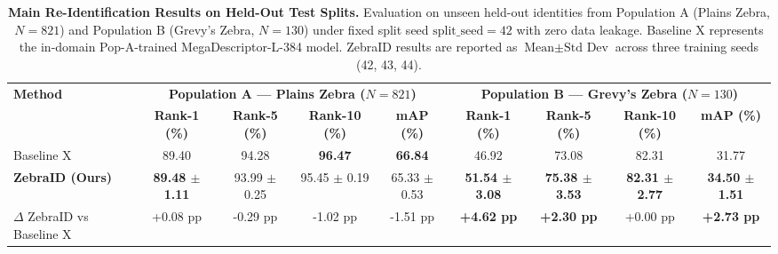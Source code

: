 \begin{table}[t]
\centering
\small
\caption{\textbf{Main Re-Identification Results on Held-Out Test Splits.} Evaluation on unseen held-out identities from Population A (Plains Zebra, $N=821$) and Population B (Grevy's Zebra, $N=130$) under fixed split seed $\text{split\_seed}=42$ with zero data leakage. Baseline X represents the in-domain Pop-A-trained MegaDescriptor-L-384 model. ZebraID results are reported as $\text{Mean} \pm \text{Std Dev}$ across three training seeds (42, 43, 44).}
\label{tab:main_results}
\begin{tabular}{lcccccccc}
\toprule
\multirow{2}{*}{\textbf{Method}} & \multicolumn{4}{c}{\textbf{Population A — Plains Zebra ($N=821$)}} & \multicolumn{4}{c}{\textbf{Population B — Grevy's Zebra ($N=130$)}} \\
\cmidrule(lr){2-5} \cmidrule(lr){6-9}
& \textbf{Rank-1 (\%)} & \textbf{Rank-5 (\%)} & \textbf{Rank-10 (\%)} & \textbf{mAP (\%)} & \textbf{Rank-1 (\%)} & \textbf{Rank-5 (\%)} & \textbf{Rank-10 (\%)} & \textbf{mAP (\%)} \\
\midrule
Baseline X & 89.40 & 94.28 & \textbf{96.47} & \textbf{66.84} & 46.92 & 73.08 & 82.31 & 31.77 \\
\textbf{ZebraID (Ours)} & \textbf{89.48 $\pm$ 1.11} & 93.99 $\pm$ 0.25 & 95.45 $\pm$ 0.19 & 65.33 $\pm$ 0.53 & \textbf{51.54 $\pm$ 3.08} & \textbf{75.38 $\pm$ 3.53} & \textbf{82.31 $\pm$ 2.77} & \textbf{34.50 $\pm$ 1.51} \\
\midrule
$\Delta$ ZebraID vs Baseline X & +0.08 pp & -0.29 pp & -1.02 pp & -1.51 pp & \textbf{+4.62 pp} & \textbf{+2.30 pp} & +0.00 pp & \textbf{+2.73 pp} \\
\bottomrule
\end{tabular}
\end{table}

